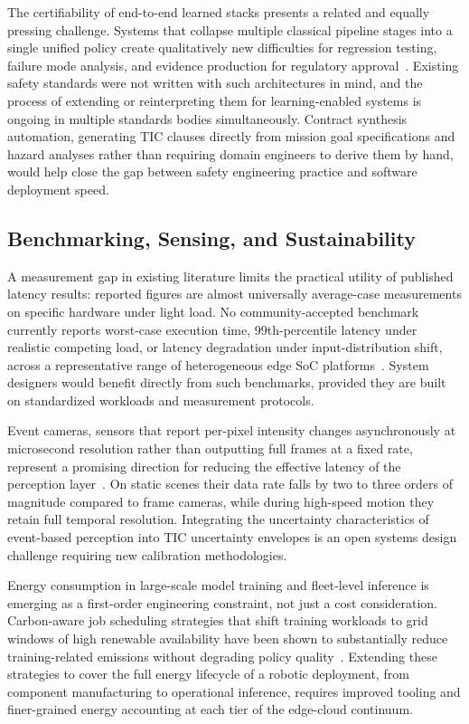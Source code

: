 \documentclass[smallextended]{svjour3}
\begin{document}
The certifiability of end-to-end learned stacks presents a related and equally pressing challenge. Systems that collapse multiple classical pipeline stages into a single unified policy create qualitatively new difficulties for regression testing, failure mode analysis, and evidence production for regulatory approval~\cite{seshia2022,brunke2022}. Existing safety standards were not written with such architectures in mind, and the
process of extending or reinterpreting them for learning-enabled systems is ongoing in multiple standards bodies simultaneously. Contract synthesis automation, generating TIC clauses directly from mission goal specifications and hazard analyses rather than requiring domain engineers to derive them by hand, would help close the gap between safety engineering practice and software deployment speed.

\subsection{Benchmarking, Sensing, and Sustainability}

A measurement gap in existing literature limits the practical utility of published latency results: reported figures are almost universally average-case measurements on specific hardware under light load. No community-accepted benchmark currently reports worst-case execution time, 99th-percentile latency under realistic competing load, or latency degradation under input-distribution shift, across a representative range of heterogeneous edge SoC platforms~\cite{amalou2023cawet}. System designers would benefit directly from such benchmarks, provided they are built on standardized workloads and measurement protocols.

Event cameras, sensors that report per-pixel intensity changes asynchronously at microsecond resolution rather than outputting full frames at a fixed rate, represent a promising direction for reducing the effective latency of the perception layer~\cite{gallego2022}. On static scenes their data rate falls by two to three orders of magnitude compared to frame cameras, while during high-speed motion they retain full temporal resolution. Integrating the uncertainty characteristics of event-based perception into TIC uncertainty envelopes is an open systems design challenge requiring new calibration methodologies.

Energy consumption in large-scale model training and fleet-level inference is emerging as a first-order engineering constraint, not just a cost consideration. Carbon-aware job scheduling strategies that shift training workloads to grid windows of high renewable availability have been shown to substantially reduce training-related emissions without degrading policy quality~\cite{strubell2019energy,patterson2021carbon,dodge2022carbon}. Extending these strategies to cover the full energy lifecycle of a robotic deployment, from component manufacturing to operational inference, requires improved tooling and finer-grained energy accounting at each tier of the edge-cloud continuum.
\end{document}

